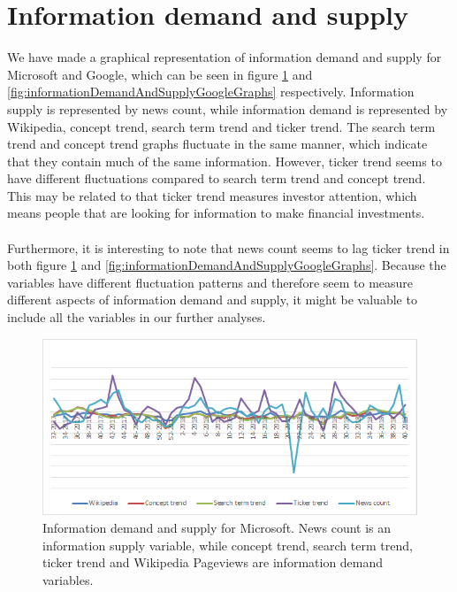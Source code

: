 \section{Information demand and supply}
We have made a graphical representation of information demand and supply for Microsoft and Google, which can be seen in figure \ref{fig:informationDemandAndSupplyGraphsMicrosoft} and \ref{fig:informationDemandAndSupplyGoogleGraphs} respectively. Information supply is represented by news count, while information demand is represented by Wikipedia, concept trend, search term trend and ticker trend. The search term trend and concept trend graphs fluctuate in the same manner, which indicate that they contain much of the same information. However, ticker trend seems to have different fluctuations compared to search term trend and concept trend. This may be related to that ticker trend measures investor attention, which means people that are looking for information to make financial investments.
\\\\
Furthermore, it is interesting to note that news count seems to lag ticker trend in both figure \ref{fig:informationDemandAndSupplyGraphsMicrosoft} and \ref{fig:informationDemandAndSupplyGoogleGraphs}. Because the variables have different fluctuation patterns and therefore seem to measure different aspects of information demand and supply, it might be valuable to include all the variables in our further analyses. 
\begin{figure}[h!]
  \centering
    \includegraphics[width=1\textwidth]{fig/informationSupplyAndDemandGraphsMicrosoftWithoutYAxis.png}
 \caption{Information demand and supply for Microsoft. News count is an information supply variable, while concept trend, search term trend, ticker trend and Wikipedia Pageviews are information demand variables.}
\label{fig:informationDemandAndSupplyGraphsMicrosoft}
\end{figure}
